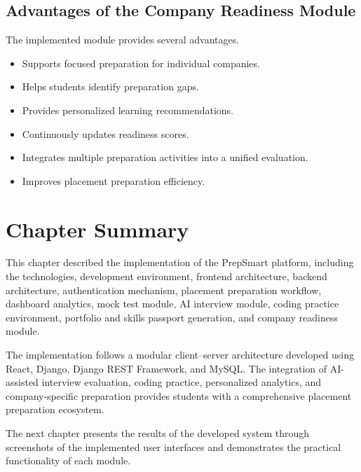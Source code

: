 \subsection{Advantages of the Company Readiness Module}

The implemented module provides several advantages.

\begin{itemize}

\item Supports focused preparation for individual companies.

\item Helps students identify preparation gaps.

\item Provides personalized learning recommendations.

\item Continuously updates readiness scores.

\item Integrates multiple preparation activities into a unified evaluation.

\item Improves placement preparation efficiency.

\end{itemize}

\section{Chapter Summary}

This chapter described the implementation of the PrepSmart platform, including the technologies, development environment, frontend architecture, backend architecture, authentication mechanism, placement preparation workflow, dashboard analytics, mock test module, AI interview module, coding practice environment, portfolio and skills passport generation, and company readiness module.

The implementation follows a modular client--server architecture developed using React, Django, Django REST Framework, and MySQL. The integration of AI-assisted interview evaluation, coding practice, personalized analytics, and company-specific preparation provides students with a comprehensive placement preparation ecosystem.

The next chapter presents the results of the developed system through screenshots of the implemented user interfaces and demonstrates the practical functionality of each module.